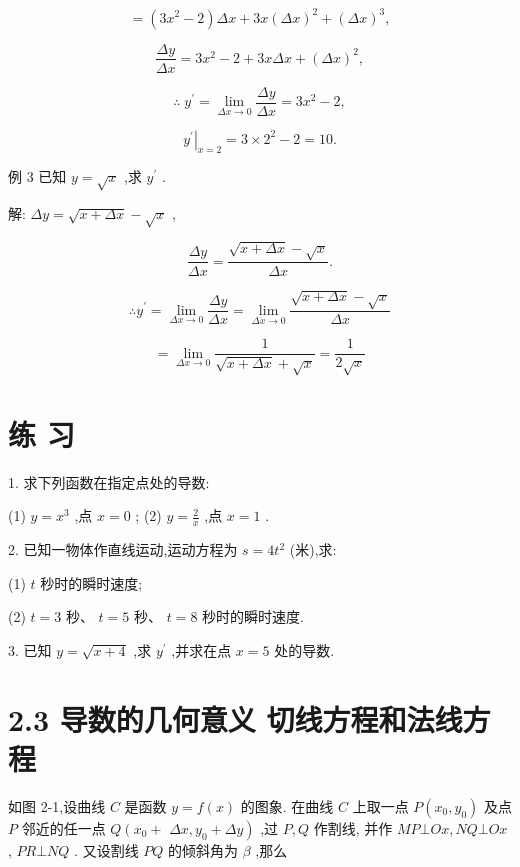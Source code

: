 \documentclass[10pt]{article}
\begin{document}
\[
= \left( {3{x}^{2} - 2}\right) {\Delta x} + {3x}{\left( \Delta x\right) }^{2} + {\left( \Delta x\right) }^{3},
\]

\[
\frac{\Delta y}{\Delta x} = 3{x}^{2} - 2 + {3x\Delta x} + {\left( \Delta x\right) }^{2},
\]

\[
\therefore \;{y}^{\prime } = \mathop{\lim }\limits_{{{\Delta x} \rightarrow 0}}\frac{\Delta y}{\Delta x} = 3{x}^{2} - 2,
\]

\[
{\left. {y}^{\prime }\right| }_{x = 2} = 3 \times {2}^{2} - 2 = {10}.
\]

例 3 已知 \(y = \sqrt{x}\) ,求 \({y}^{\prime }\) .

解: \({\Delta y} = \sqrt{x + {\Delta x}} - \sqrt{x}\) ,

\[
\frac{\Delta y}{\Delta x} = \frac{\sqrt{x + {\Delta x}} - \sqrt{x}}{\Delta x}.
\]

\[
\therefore {y}^{\prime } = \mathop{\lim }\limits_{{{\Delta x} \rightarrow 0}}\frac{\Delta y}{\Delta x} = \mathop{\lim }\limits_{{\Delta \dot{x} \rightarrow 0}}\frac{\sqrt{x + {\Delta x}} - \sqrt{x}}{\Delta x}
\]

\[
= \mathop{\lim }\limits_{{{\Delta x} \rightarrow 0}}\frac{1}{\sqrt{x + {\Delta x}} + \sqrt{x}} = \frac{1}{2\sqrt{x}}
\]

\section*{练 习}

1. 求下列函数在指定点处的导数:

(1) \(y = {x}^{3}\) ,点 \(x = 0\) ; (2) \(y = \frac{2}{x}\) ,点 \(x = 1\) .

2. 已知一物体作直线运动,运动方程为 \(s = 4{t}^{2}\) (米),求:

(1) \(t\) 秒时的瞬时速度;

(2) \(t = 3\) 秒、 \(t = 5\) 秒、 \(t = 8\) 秒时的瞬时速度.

3. 已知 \(y = \sqrt{x + 4}\) ,求 \({y}^{\prime }\) ,并求在点 \(x = 5\) 处的导数.

\section*{2.3 导数的几何意义 切线方程和法线方程}

如图 2-1,设曲线 \(C\) 是函数 \(y = f\left( x\right)\) 的图象. 在曲线 \(C\) 上取一点 \(P\left( {{x}_{0},{y}_{0}}\right)\) 及点 \(P\) 邻近的任一点 \(Q\left( {{x}_{0} + }\right.\) \(\left. {{\Delta x},{y}_{0} + {\Delta y}}\right)\) ,过 \(P,Q\) 作割线, 并作 \({MP} \bot {Ox},{NQ} \bot {Ox}\) , \({PR} \bot {NQ}\) . 又设割线 \({PQ}\) 的倾斜角为 \(\beta\) ,那么
\end{document}
